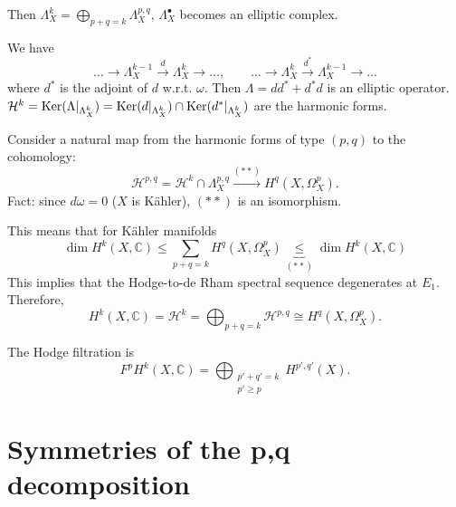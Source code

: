 Then
$\Lambda_X^k=\bigoplus_{p+q=k}\Lambda_X^{p,q}
$,
$\Lambda^\bullet_X$ becomes an elliptic
complex.

We have
$$
… \to \Lambda_X^{k-1}\xrightarrow{d}
\Lambda_X^k\to …,
\qquad
…\to\Lambda_X^k
\xrightarrow{d^*}\Lambda_X^{k-1}\to…
$$
where $d^*$ is the adjoint of $d$ w.r.t.
$\omega$.
Then $\Lambda=d d^*+d^*d$ is an elliptic
operator.
$\mathcal{H}^k=\mathop{\mathrm{Ker}}(\Lambda|_{\Lambda^k_X})
=\mathop{\mathrm{Ker}}(d|_{\Lambda^k_X})\cap
\mathop{\mathrm{Ker}}(d^*|_{\Lambda^k_X})$
are the harmonic forms.

Consider a natural map from the harmonic
forms of type $(p,q)$
to the cohomology:
$$
\mathcal{H}^{p,q}=\mathcal{H}
^k\cap\Lambda^{p,q}_X
\xrightarrow{(\ast \ast)} H^q(X,\Omega_X^p).
$$
Fact: since $d\omega=0$ ($X$ is Kähler),
$(\ast\ast)$ is an isomorphism.

This means that for Kähler manifolds
$$
\dim H^k(X,\mathbb{C})
\leq
\sum_{p+q=k}H^q(X,\Omega_X^p)
\underbrace{\leq}_{(\ast \ast)}
\dim H^k(X,\mathbb{C})
$$
This implies that the Hodge-to-de Rham
spectral sequence
degenerates at $E_1$. Therefore,
$$
H^k(X,\mathbb{C})=\mathcal{H}^k=
\bigoplus_{p+q=k}\mathcal{H}^{p,q}\cong
H^q(X,\Omega_X^p).
$$

The Hodge filtration is
$$
F^pH^k(X,\mathbb{C})=\bigoplus_{\substack{p'+
q'=k
\\ p' \geq p}}
H^{p',q'}(X).
$$

\section{Symmetries of the p,q decomposition}
\label{section-symme-p-q-decom}

